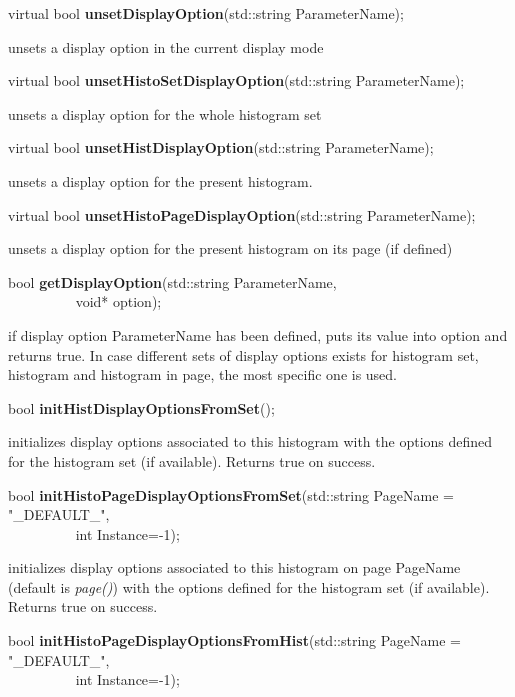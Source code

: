\item    virtual bool {\bf unsetDisplayOption}(std::string ParameterName);


 unsets a display option in the current display mode


\item    virtual bool {\bf unsetHistoSetDisplayOption}(std::string ParameterName); 


 unsets a display option for the whole histogram set


\item    virtual bool {\bf unsetHistDisplayOption}(std::string ParameterName); 


 unsets a display option for the present histogram.


\item    virtual bool {\bf unsetHistoPageDisplayOption}(std::string ParameterName);


 unsets a display option for the present histogram on its page (if defined)


\item    bool {\bf getDisplayOption}(std::string ParameterName,\\\mbox{}~~~~~~~~~
			void* option);

 if display option  ParameterName has been defined, puts its value into
 option and returns true. In case different sets of display options
 exists for histogram set, histogram and histogram in page, the most
 specific one is used.


\item    bool {\bf initHistDisplayOptionsFromSet}(); 


 initializes display options associated to this histogram with the
 options defined for the histogram set (if available). Returns true on
 success.


\item    bool {\bf initHistoPageDisplayOptionsFromSet}(std::string PageName = "\_DEFAULT\_",\\\mbox{}~~~~~~~~~
					  int Instance=-1);

 initializes display options associated to this histogram on page
 PageName (default is {\it page()}) with the
 options defined for the histogram set (if available). Returns true on
 success.


\item    bool {\bf initHistoPageDisplayOptionsFromHist}(std::string PageName = "\_DEFAULT\_",\\\mbox{}~~~~~~~~~
					   int Instance=-1);

